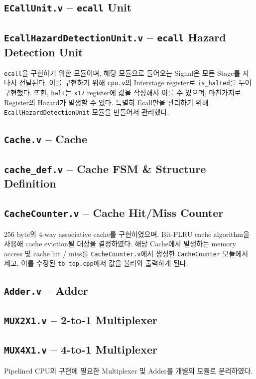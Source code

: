 \documentclass{scrartcl}
\begin{document}
\subsection{\texttt{ECallUnit.v} -- \texttt{ecall} Unit}
\subsection{\texttt{EcallHazardDetectionUnit.v} -- \texttt{ecall} Hazard Detection Unit}
\texttt{ecall}을 구현하기 위한 모듈이며, 해당 모듈으로 들어오는 Signal은 모든 Stage를 지나서 전달된다. 이를 구현하기 위해 \texttt{cpu.v}의 Interstage register로 \texttt{is\_halted}를 두어 구현했다.
또한, \texttt{halt}는 \texttt{x17} register에 값을 작성해서 이룰 수 있으며, 마찬가지로 Register의 Hazard가 발생할 수 있다. 특별히 Ecall만을 관리하기 위해 \texttt{EcallHazardDetectionUnit} 모듈을 만들어서 관리했다.

\subsection{\texttt{Cache.v} -- Cache}
\subsection{\texttt{cache\_def.v} -- Cache FSM \& Structure Definition}
\subsection{\texttt{CacheCounter.v} -- Cache Hit/Miss Counter}
256 byte의 4-way associative cache를 구현하였으며, Bit-PLRU cache algorithm을 사용해 cache eviction될 대상을 결정하였다.
해당 Cache에서 발생하는 memory access 및 cache hit / miss를 \texttt{CacheCounter.v}에서 생성한 \texttt{CacheCounter} 모듈에서 세고,
이를 수정된 \texttt{tb\_top.cpp}에서 값을 불러와 출력하게 된다.

\subsection{\texttt{Adder.v} -- Adder}
\subsection{\texttt{MUX2X1.v} -- 2-to-1 Multiplexer}
\subsection{\texttt{MUX4X1.v} -- 4-to-1 Multiplexer}
Pipelined CPU의 구현에 필요한 Multiplexer 및 Adder를 개별의 모듈로 분리하였다.
\end{document}
